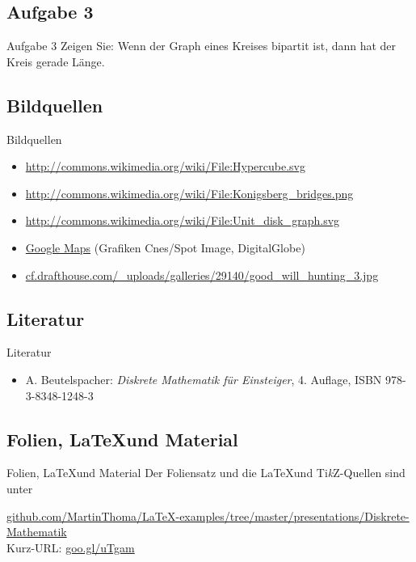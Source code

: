 \subsection{Aufgabe 3}
\begin{frame}{Aufgabe 3}
Zeigen Sie: Wenn der Graph eines Kreises bipartit ist, dann hat der Kreis gerade Länge.
\end{frame}

\subsection{Bildquellen}
\begin{frame}{Bildquellen}
\begin{itemize}
	\item \href{http://commons.wikimedia.org/wiki/File:Hypercube.svg}{http://commons.wikimedia.org/wiki/File:Hypercube.svg}
    \item \href{http://commons.wikimedia.org/wiki/File:Konigsberg\_bridges.png}{http://commons.wikimedia.org/wiki/File:Konigsberg\_bridges.png}
    \item \href{http://commons.wikimedia.org/wiki/File:Unit\_disk\_graph.svg}{http://commons.wikimedia.org/wiki/File:Unit\_disk\_graph.svg}
    \item \href{http://goo.gl/maps/WnXRh}{Google Maps} (Grafiken  Cnes/Spot Image, DigitalGlobe)
	\item \href{http://cf.drafthouse.com/\_uploads/galleries/29140/good_will\_hunting\_3.jpg}{cf.drafthouse.com/\_uploads/galleries/29140/good\_will\_hunting\_3.jpg}
\end{itemize}
\end{frame}

\subsection{Literatur}
\begin{frame}{Literatur}
\begin{itemize}
    \item A. Beutelspacher: \textit{Diskrete Mathematik für Einsteiger}, 4. Auflage, ISBN 978-3-8348-1248-3
\end{itemize}
\end{frame}

\subsection{Folien, \LaTeX und Material}
\begin{frame}{Folien, \LaTeX und Material}
Der Foliensatz und die \LaTeX und Ti\textit{k}Z-Quellen sind unter

\href{https://github.com/MartinThoma/LaTeX-examples/tree/master/presentations/Diskrete-Mathematik}{github.com/MartinThoma/LaTeX-examples/tree/master/presentations/Diskrete-Mathematik}
\\

Kurz-URL:
\href{http://goo.gl/uTgam}{goo.gl/uTgam}
\end{frame}
